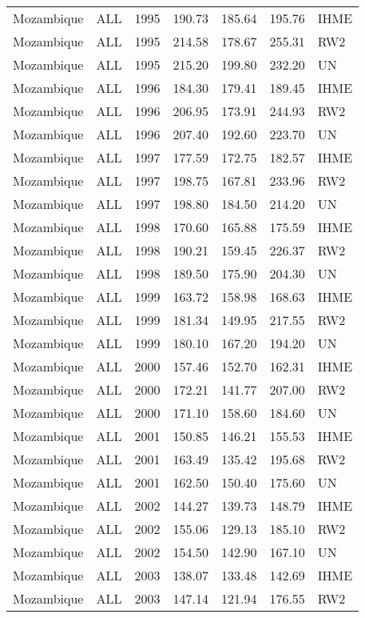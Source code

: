 \begin{longtable}{lllrrrl}
  Mozambique & ALL & 1995 & 190.73 & 185.64 & 195.76 & IHME \\ 
  Mozambique & ALL & 1995 & 214.58 & 178.67 & 255.31 & RW2 \\ 
  Mozambique & ALL & 1995 & 215.20 & 199.80 & 232.20 & UN \\ 
  Mozambique & ALL & 1996 & 184.30 & 179.41 & 189.45 & IHME \\ 
  Mozambique & ALL & 1996 & 206.95 & 173.91 & 244.93 & RW2 \\ 
  Mozambique & ALL & 1996 & 207.40 & 192.60 & 223.70 & UN \\ 
  Mozambique & ALL & 1997 & 177.59 & 172.75 & 182.57 & IHME \\ 
  Mozambique & ALL & 1997 & 198.75 & 167.81 & 233.96 & RW2 \\ 
  Mozambique & ALL & 1997 & 198.80 & 184.50 & 214.20 & UN \\ 
  Mozambique & ALL & 1998 & 170.60 & 165.88 & 175.59 & IHME \\ 
  Mozambique & ALL & 1998 & 190.21 & 159.45 & 226.37 & RW2 \\ 
  Mozambique & ALL & 1998 & 189.50 & 175.90 & 204.30 & UN \\ 
  Mozambique & ALL & 1999 & 163.72 & 158.98 & 168.63 & IHME \\ 
  Mozambique & ALL & 1999 & 181.34 & 149.95 & 217.55 & RW2 \\ 
  Mozambique & ALL & 1999 & 180.10 & 167.20 & 194.20 & UN \\ 
  Mozambique & ALL & 2000 & 157.46 & 152.70 & 162.31 & IHME \\ 
  Mozambique & ALL & 2000 & 172.21 & 141.77 & 207.00 & RW2 \\ 
  Mozambique & ALL & 2000 & 171.10 & 158.60 & 184.60 & UN \\ 
  Mozambique & ALL & 2001 & 150.85 & 146.21 & 155.53 & IHME \\ 
  Mozambique & ALL & 2001 & 163.49 & 135.42 & 195.68 & RW2 \\ 
  Mozambique & ALL & 2001 & 162.50 & 150.40 & 175.60 & UN \\ 
  Mozambique & ALL & 2002 & 144.27 & 139.73 & 148.79 & IHME \\ 
  Mozambique & ALL & 2002 & 155.06 & 129.13 & 185.10 & RW2 \\ 
  Mozambique & ALL & 2002 & 154.50 & 142.90 & 167.10 & UN \\ 
  Mozambique & ALL & 2003 & 138.07 & 133.48 & 142.69 & IHME \\ 
  Mozambique & ALL & 2003 & 147.14 & 121.94 & 176.55 & RW2 \\ 

\end{longtable}

